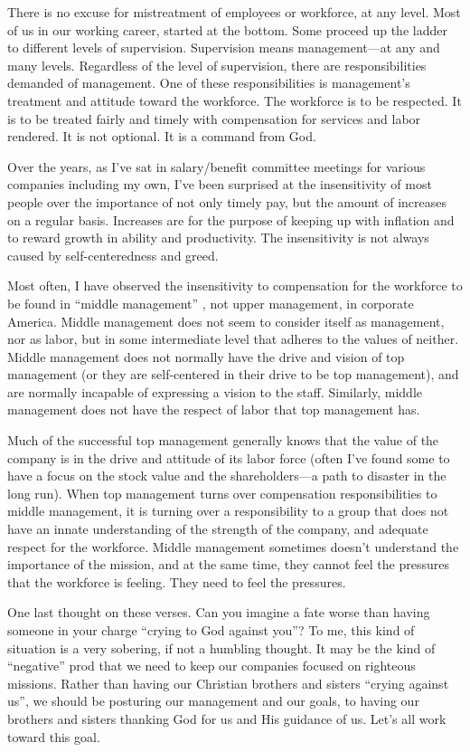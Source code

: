 \documentclass[12pt]{memoir}
\begin{document}
There is no excuse for mistreatment of employees or workforce, at
any level. Most of us in our working career, started at the bottom.
Some proceed up the ladder to different levels of supervision. Supervision
means management---at any and many levels. Regardless of the level
of supervision, there are responsibilities demanded of management.
One of these responsibilities is management's treatment and attitude
toward the workforce. The workforce is to be respected. It is to be
treated fairly and timely with compensation for services and labor
rendered. It is not optional. It is a command from God.

Over the years, as I've sat in salary\slash{}benefit committee meetings for
various companies including my own, I've been surprised at the insensitivity
of most people over the importance of not only timely pay, but the
amount of increases on a regular basis. Increases are for the purpose
of keeping up with inflation and to reward growth in ability and productivity.
The insensitivity is not always caused by self-centeredness and greed. 

Most often, I have observed the insensitivity to compensation for
the workforce to be found in ``middle management'' , not upper management,
in corporate America. Middle management does not seem to consider
itself as management, nor as labor, but in some intermediate level
that adheres to the values of neither. Middle management does not
normally have the drive and vision of top management (or they are
self-centered in their drive to be top management), and are normally
incapable of expressing a vision to the staff. Similarly, middle management
does not have the respect of labor that top management has. 

Much of the successful top management generally knows that the value
of the company is in the drive and attitude of its labor force (often
I've found some to have a focus on the stock value and the shareholders---a
path to disaster in the long run). When top management turns over
compensation responsibilities to middle management, it is turning
over a responsibility to a group that does not have an innate understanding
of the strength of the company, and adequate respect for the workforce.
Middle management sometimes doesn't understand the importance of the
mission, and at the same time, they cannot feel the pressures that
the workforce is feeling. They need to feel the pressures.

One last thought on these verses. Can you imagine a fate worse than
having someone in your charge ``crying to God against you''? To
me, this kind of situation is a very sobering, if not a humbling thought.
It may be the kind of ``negative'' prod that we need to keep our
companies focused on righteous missions. Rather than having our Christian
brothers and sisters ``crying against us'', we should be posturing
our management and our goals, to having our brothers and sisters thanking
God for us and His guidance of us. Let's all work toward this goal.
\end{document}

